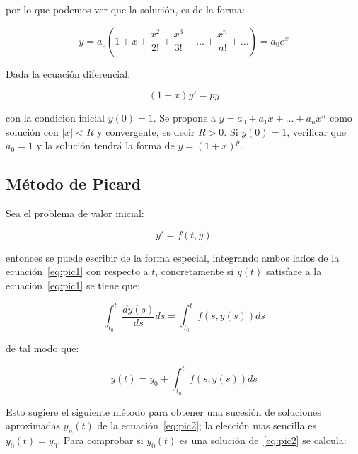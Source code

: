 		por lo que podemos ver que la solución, es de la forma:

		\begin{equation*}
			y = a_0 (1 + x + \frac{x^2}{2!} + \frac{x^3}{3!} + \dots + \frac{x^n}{n!} + \dots) = a_0 e^x
		\end{equation*}

		\begin{ejercicio}
			Dada la ecuación diferencial:

			\begin{equation*}
				(1 + x) y' = p y
			\end{equation*}

			con la condicion inicial $y(0) = 1$.
			Se propone a $y = a_0 + a_1 x + \dots + a_n x^n$ como solución con $|x| < R$ y convergente, es decir $R > 0$.
			Si $y(0) = 1$, verificar que $a_0 = 1$ y la solución tendrá la forma de $y = (1 + x)^p$.
		\end{ejercicio}

	\newpage
	\subsection{Método de Picard}

		Sea el problema de valor inicial:

		\begin{equation} \label{eq:pic1}
			y' = f(t, y)
		\end{equation}

		entonces se puede escribir de la forma especial, integrando ambos lados de la ecuación~\ref{eq:pic1} con respecto a $t$, concretamente si $y(t)$ satisface a la ecuación~\ref{eq:pic1} se tiene que:

		\begin{equation*}
			\int_{t_0}^t \frac{dy(s)}{ds} ds = \int_{t_0}^t f(s, y(s)) ds
		\end{equation*}

		de tal modo que:

		\begin{equation} \label{eq:pic2}
			y(t) = y_0 + \int_{t_0}^t f(s, y(s)) ds
		\end{equation}

		Esto sugiere el siguiente método para obtener una sucesión de soluciones aproximadas $y_n(t)$ de la ecuación~\ref{eq:pic2}; la elección mas sencilla es $y_0(t) = y_0$.
		Para comprobar si $y_0(t)$ es una solución de~\ref{eq:pic2} se calcula:


